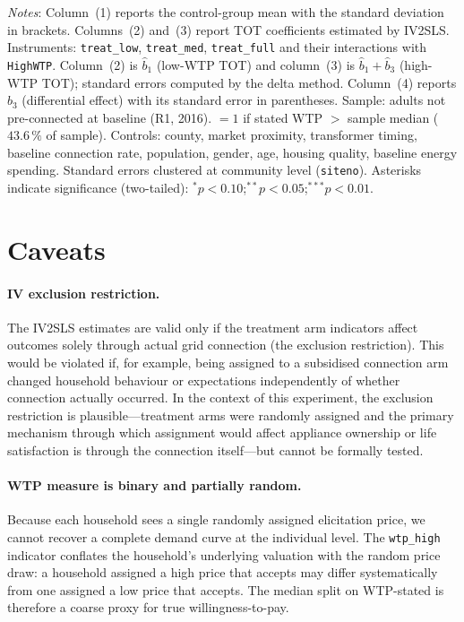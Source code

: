 \documentclass[12pt]{article}
\begin{document}
\begin{singlespace}
\begin{table}[H]
\begin{minipage}{\linewidth}
\footnotesize
\setlength{\parskip}{2pt}
\textit{Notes}: Column~(1) reports the control-group mean with the standard
deviation in brackets. Columns~(2) and~(3) report TOT coefficients estimated
by IV2SLS. Instruments: \texttt{treat\_low}, \texttt{treat\_med},
\texttt{treat\_full} and their interactions with \texttt{HighWTP}.
Column~(2) is $\hat{b}_1$ (low-WTP TOT) and column~(3) is
$\hat{b}_1 + \hat{b}_3$ (high-WTP TOT); standard errors computed by the
delta method. Column~(4) reports $\hat{b}_3$ (differential effect) with its
standard error in parentheses. Sample: adults not pre-connected at baseline
(R1, 2016).  $= 1$ if stated WTP $>$ sample median ($43.6\,\%$
of sample). Controls: county, market proximity, transformer timing, baseline
connection rate, population, gender, age, housing quality, baseline energy
spending. Standard errors clustered at community level (\texttt{siteno}).
Asterisks indicate significance (two-tailed):
$^{*}p<0.10$;\;$^{**}p<0.05$;\;$^{***}p<0.01$.
\end{minipage}
\end{table}

\end{singlespace}
\restoregeometry

\section{Caveats}
\label{sec:caveats}

\paragraph{IV exclusion restriction.}
The IV2SLS estimates are valid only if the treatment arm indicators affect
outcomes solely through actual grid connection (the exclusion restriction).
This would be violated if, for example, being assigned to a subsidised
connection arm changed household behaviour or expectations independently
of whether connection actually occurred. In the context of this experiment,
the exclusion restriction is plausible---treatment arms were randomly
assigned and the primary mechanism through which assignment would affect
appliance ownership or life satisfaction is through the connection
itself---but cannot be formally tested.

\paragraph{WTP measure is binary and partially random.}
Because each household sees a single randomly assigned elicitation
price, we cannot recover a complete demand curve at the individual
level. The \texttt{wtp\_high} indicator conflates the household's
underlying valuation with the random price draw: a household assigned
a high price that accepts may differ systematically from one assigned a
low price that accepts. The median split on WTP-stated is therefore a
coarse proxy for true willingness-to-pay.
\end{document}
